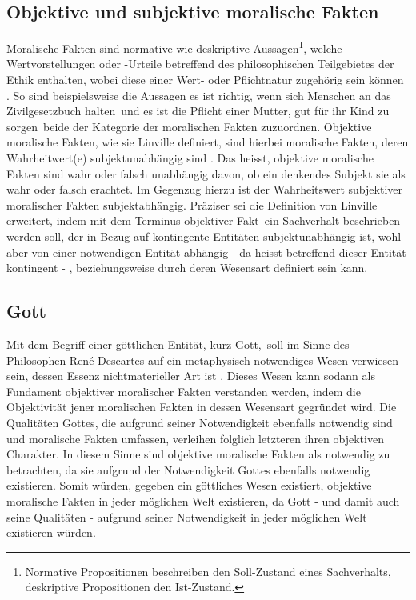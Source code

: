 \documentclass[a4paper,11pt]{article}
\numberwithin{equation}{section}
\begin{document}
\subsection{Objektive und subjektive moralische Fakten}\label{defobjsubjmorfakt}
Moralische Fakten sind normative wie deskriptive Aussagen\footnote{Normative Propositionen beschreiben den Soll-Zustand eines Sachverhalts, deskriptive Propositionen den Ist-Zustand.}, welche Wertvorstellungen oder -Urteile betreffend des philosophischen Teilgebietes der Ethik enthalten, wobei diese  einer Wert- oder Pflichtnatur zugehörig sein können \cite[S. 68-73]{Ruffing.2006}. So sind beispielsweise die Aussagen \flqq es ist richtig, wenn sich Menschen an das Zivilgesetzbuch halten\frqq\ und \flqq es ist die Pflicht einer Mutter, gut für ihr Kind zu sorgen\frqq\ beide der Kategorie der moralischen Fakten zuzuordnen. Objektive moralische Fakten, wie sie Linville definiert, sind hierbei moralische Fakten, deren Wahrheitwert(e) subjektunabhängig sind \cite[S. 395]{Linville2009-LINTMA-2}. Das heisst, objektive moralische Fakten sind wahr oder falsch unabhängig davon, ob ein denkendes Subjekt sie als wahr oder falsch erachtet. Im Gegenzug hierzu ist der Wahrheitswert subjektiver moralischer Fakten subjektabhängig. Präziser sei die Definition von Linville erweitert, indem mit dem Terminus \flqq objektiver Fakt\frqq\ ein Sachverhalt beschrieben werden soll, der in Bezug auf kontingente Entitäten subjektunabhängig ist, wohl aber von einer notwendigen Entität abhängig - da heisst betreffend dieser Entität kontingent - , beziehungsweise durch deren Wesensart definiert sein kann.

\subsection{Gott}
Mit dem Begriff einer göttlichen Entität, kurz \flqq Gott\frqq,\ soll im Sinne des Philosophen René Descartes auf ein metaphysisch notwendiges Wesen verwiesen sein, dessen Essenz nichtmaterieller Art ist \cite[S. 18]{Nagasawa.2011}. Dieses Wesen kann sodann als Fundament objektiver moralischer Fakten verstanden werden, indem die Objektivität jener moralischen Fakten in dessen Wesensart gegründet wird. Die Qualitäten Gottes, die aufgrund seiner Notwendigkeit ebenfalls notwendig sind und moralische Fakten umfassen, verleihen folglich letzteren ihren objektiven Charakter. In diesem Sinne sind objektive moralische Fakten als notwendig zu betrachten, da sie aufgrund der Notwendigkeit Gottes ebenfalls notwendig existieren. Somit würden, gegeben ein göttliches Wesen existiert, objektive moralische Fakten in jeder möglichen Welt existieren, da Gott - und damit auch seine Qualitäten - aufgrund seiner Notwendigkeit in jeder möglichen Welt existieren würden.
\end{document}
